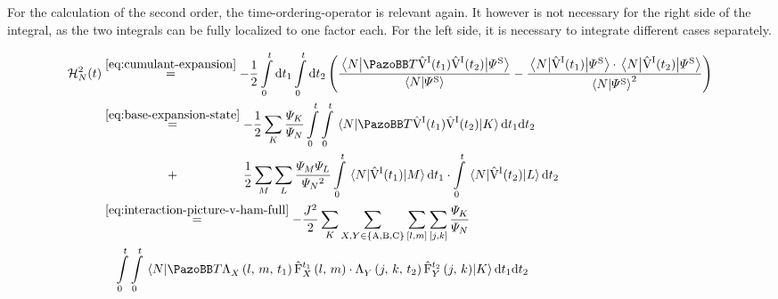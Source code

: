 For the calculation of the second order, the time-ordering-operator is relevant again. 
It however is not necessary for the right side of the integral, as the two integrals can be fully localized to one factor each.
For the left side, it is necessary to integrate different cases separately.

\begin{equation}
    \label{eq:hn-integrated-second-order}
    \begin{split}
        \HNOftOrder{2} &\stackrel{\ref{eq:cumulant-expansion}}{=} - \frac{1}{2} \int\limits_0^t\mathrm{d}t_1 \int\limits_0^t\mathrm{d}t_2
        \left(
        \frac{\bracketHelper{N}{\timeOrderingOperator
        \VhamiltonianOf[\interactionPicture]{t_1}\VhamiltonianOf[\interactionPicture]{t_2}
        }{\picturePsi[\schroedingerPicture]{}}}{\braketHelper{N}{\picturePsi[\schroedingerPicture]{}}} -  \frac{\bracketHelper{N}{\VhamiltonianOf[\interactionPicture]{t_1}}{\picturePsi[\schroedingerPicture]{}} \cdot \bracketHelper{N}{\VhamiltonianOf[\interactionPicture]{t_2}}{\picturePsi[\schroedingerPicture]{}}}{\braketHelper{N}{\picturePsi[\schroedingerPicture]{}}^2}
        \right)\\
        &\stackrel{\ref{eq:base-expansion-state}}{=}
        - \frac{1}{2} \lsum[K] \frac{\psiN[K]}{\psiN} \int\limits_0^t \int\limits_0^t        \bracketHelper{N}{\timeOrderingOperator
        \VhamiltonianOf[\interactionPicture]{t_1}\VhamiltonianOf[\interactionPicture]{t_2}
        }{K}            \mathrm{d}t_1\mathrm{d}t_2 \\
        &\stackrel{\phantom{\ref{eq:base-expansion-state}}}{+} 
        \frac{1}{2}
        \lsum[M]\lsum[L]
        \frac{\psiN[M]\psiN[L]}{\psiN{}^2}
        \int\limits_0^t \bracketHelper{N}{\VhamiltonianOf[\interactionPicture]{t_1}}{M}  \mathrm{d}t_1
        \cdot
        \int\limits_0^t \bracketHelper{N}{\VhamiltonianOf[\interactionPicture]{t_2}}{L}  \mathrm{d}t_2\\
        &\stackrel{\ref{eq:interaction-picture-v-ham-full}}{=}
        - \frac{J^2}{2} \lsum[K]\lsum[X,Y \in \left\{\text{A}, \text{B}, \text{C}\right\}] \fullneighborsum{l}{m}\fullneighborsum{j}{k}
        \frac{\psiN[K]}{\psiN} \\&\quad
        \int\limits_0^t \int\limits_0^t        \bracketHelper{N}{\timeOrderingOperator
        \VhamiltonianAnalyticalPart{$X$}{l}{m}{t_1} \VhamiltonianOperatorPart[t_1]{$X$}{l}{m}
        \cdot 
        \VhamiltonianAnalyticalPart{$Y$}{j}{k}{t_2} \VhamiltonianOperatorPart[t_2]{$Y$}{j}{k}
        }{K}            \mathrm{d}t_1\mathrm{d}t_2 \\

\end{split}
\end{equation}
